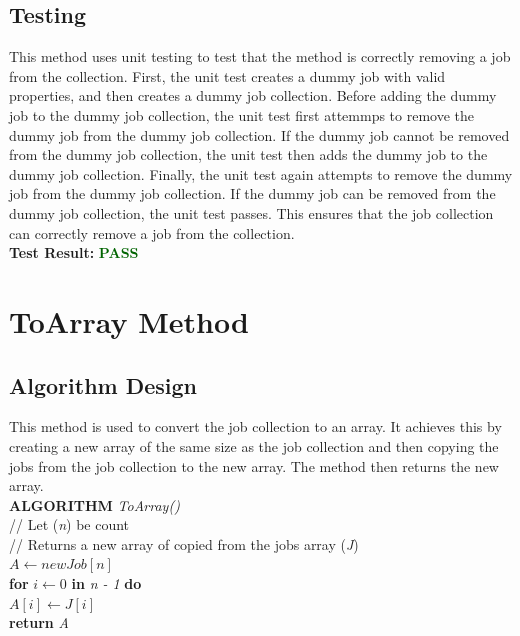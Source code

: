 \documentclass[12pt,a4paper]{article}
\begin{document}
		\subsection{Testing}
			This method uses unit testing to test that the method is correctly removing a job from the 
			collection. First, the unit test creates a dummy job with valid properties, and then creates 
			a dummy job collection. Before adding the dummy job to the dummy job collection, the unit test 
			first attemmps to remove the dummy job from the dummy job collection. If the dummy job cannot 
			be removed from the dummy job collection, the unit test then adds the dummy job to the dummy 
			job collection. Finally, the unit test again attempts to remove the dummy job from the dummy 
			job collection. If the dummy job can be removed from the dummy job collection, the unit test 
			passes. This ensures that the job collection can correctly remove a job from the collection.\\

			\textbf{Test Result:} \textbf{\textcolor{darkgreen}{PASS}}\\

	\newpage
			
	\section{ToArray Method}
		\subsection{Algorithm Design}
			This method is used to convert the job collection to an array. It achieves this by creating a 
			new array of the same size as the job collection and then copying the jobs from the job 
			collection to the new array. The method then returns the new array.\\

			\textbf{ALGORITHM} \textit{ToArray()}\\
			\null\hspace{1cm}// Let (\textit{n}) be count\\
			\null\hspace{1cm}// Returns a new array of copied from the jobs array (\textit{J})\\
			\null\hspace{1cm}\textit{$A \gets new Job[n]$}\\
			\null\hspace{1cm}\textbf{for} \textit{$i \gets 0$} \textbf{in} \textit{n - 1} \textbf{do}\\
			\null\hspace{2cm}\textit{$A[i] \gets J[i]$}\\
			\null\hspace{1cm}\textbf{return} \textit{A}\\
		
\end{document}
